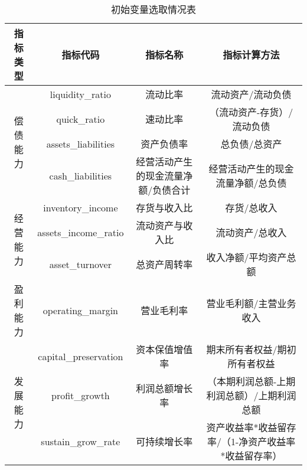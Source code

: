 \begin{sidewaystable}[!ht]\footnotesize{}
	\centering
	\caption{初始变量选取情况表}
	\label{Initial}
	\begin{tabular}{ccc|c}
	\toprule
	指标类型                  & 指标代码 & 指标名称               & 指标计算方法                                                                              \\ \toprule
	\multirow{4}{*}{偿债能力} & liquidity\_ratio   & 流动比率               & 流动资产/流动负债                                                                           \\
						  & quick\_ratio						  & 速动比率               & （流动资产-存货）/流动负债                                                                      \\
						  & assets\_liabilities
						  & 资产负债率              & 总负债/总资产                                                                             \\
						  & cash\_liabilities
						  & 经营活动产生的现金流量净额/负债合计 & 经营活动产生的现金流量净额/总负债                                                                   \\ \cline{2-4} 
	\multirow{3}{*}{经营能力} & inventory\_income
	& 存货与收入比             & 存货/总收入                                                                              \\
						  & assets\_income\_ratio
						  & 流动资产与收入比           & 流动资产/总收入                                                                            \\
						  & asset\_turnover
						  & 总资产周转率             & 收入净额/平均资产总额                                                                         \\ \cline{2-4} 
	盈利能力                  & operating\_margin
	& 营业毛利率              & 营业毛利额/主营业务收入                                                                        \\ \cline{2-4} 
	\multirow{3}{*}{发展能力} & capital\_preservation
	& 资本保值增值率            & 期末所有者权益/期初所有者权益                                                                     \\
						  & profit\_growth
						  & 利润总额增长率            & （本期利润总额-上期利润总额）/上期利润总额                                                              \\
						  & sustain\_grow\_rate
						  & 可持续增长率             & 资产收益率*收益留存率/（1-净资产收益率*收益留存率）                                                        \\ \cline{2-4} 

\end{tabular}
\end{sidewaystable}

